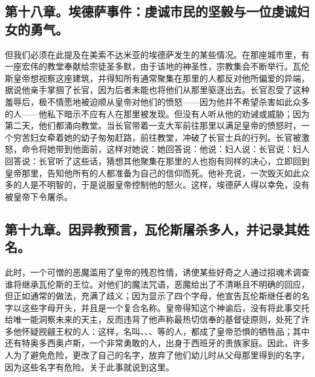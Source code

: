 
\subsection{第十八章。埃德萨事件：虔诚市民的坚毅与一位虔诚妇女的勇气。}

但我们必须在此提及在美索不达米亚的埃德萨发生的某些情况。在那座城市里，有一座宏伟的教堂奉献给宗徒圣多默，由于该地的神圣性，宗教集会不断举行。瓦伦斯皇帝想视察这座建筑，并得知所有通常聚集在那里的人都反对他所偏爱的异端，据说他亲手掌掴了长官，因为后者未能也将他们从那里驱逐出去。长官忍受了这种羞辱后，极不情愿地被迫顺从皇帝对他们的愤怒——因为他并不希望杀害如此众多的人——他私下暗示不应有人在那里被发现。但没有人听从他的劝诫或威胁；因为第二天，他们都涌向教堂。当长官带着一支大军前往那里以满足皇帝的愤怒时，一个穷苦妇女牵着她的幼子匆匆赶路，前往教堂，冲破了长官士兵的行列。长官被激怒，命令将她带到他面前，这样对她说：她回答说：他说：妇人说：长官说：妇人回答说：长官听了这些话，猜想其他聚集在那里的人也抱有同样的决心，立即回到皇帝那里，告知他所有的人都准备为自己的信仰而死。他补充说，一次毁灭如此众多的人是不明智的，于是说服皇帝控制他的怒火。这样，埃德萨人得以幸免，没有被皇帝下令屠杀。\par


\subsection{第十九章。因异教预言，瓦伦斯屠杀多人，并记录其姓名。}

此时，一个可憎的恶魔滥用了皇帝的残忍性情，诱使某些好奇之人通过招魂术调查谁将继承瓦伦斯的王位。对他们的魔法咒语，恶魔给出了不清晰且不明确的回应，但正如通常的做法，充满了歧义；因为显示了四个字母，他宣告瓦伦斯继任者的名字以这些字母开头，并且是一个复合名称。皇帝得知这个神谕后，没有将此事交托给唯一能洞察未来的天主，反而违背了他声称最热切信奉的基督徒原则，处死了许多他怀疑觊觎王权的人：这样，名叫、、、等的人，都成了皇帝恐惧的牺牲品；其中还有特奥多西奥卢斯，一个非常勇敢的人，出身于西班牙的贵族家庭。因此，许多人为了避免危险，更改了自己的名字，放弃了他们幼儿时从父母那里得到的名字，因为这些名字有危险。关于此事就说到这里。\par

